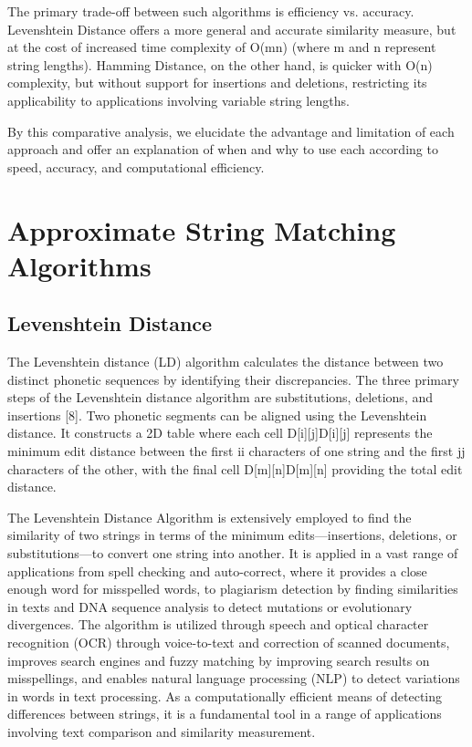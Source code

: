 \documentclass[conference]{IEEEtran}
\begin{document}
The primary trade-off between such algorithms is efficiency vs. accuracy. Levenshtein Distance offers a more general and accurate similarity measure, but at the cost of increased time complexity of O(mn) (where m and n represent string lengths). Hamming Distance, on the other hand, is quicker with O(n) complexity, but without support for insertions and deletions, restricting its applicability to applications involving variable string lengths.

By this comparative analysis, we elucidate the advantage and limitation of each approach and offer an explanation of when and why to use each according to speed, accuracy, and computational efficiency.

\section{Approximate String Matching Algorithms}

\subsection{Levenshtein Distance}
The Levenshtein distance (LD) algorithm calculates the distance between two distinct phonetic sequences by identifying their discrepancies. The three primary steps of the Levenshtein distance algorithm are substitutions, deletions, and insertions [8]. Two phonetic segments can be aligned using the Levenshtein distance. It constructs a 2D table where each cell D[i][j]D[i][j] represents the minimum edit distance between the first ii characters of one string and the first jj characters of the other, with the final cell D[m][n]D[m][n] providing the total edit distance.

The Levenshtein Distance Algorithm is extensively employed to find the similarity of two strings in terms of the minimum edits—insertions, deletions, or substitutions—to convert one string into another. It is applied in a vast range of applications from spell checking and auto-correct, where it provides a close enough word for misspelled words, to plagiarism detection by finding similarities in texts and DNA sequence analysis to detect mutations or evolutionary divergences. The algorithm is utilized through speech and optical character recognition (OCR) through voice-to-text and correction of scanned documents, improves search engines and fuzzy matching by improving search results on misspellings, and enables natural language processing (NLP) to detect variations in words in text processing. As a computationally efficient means of detecting differences between strings, it is a fundamental tool in a range of applications involving text comparison and similarity measurement.
\end{document}
